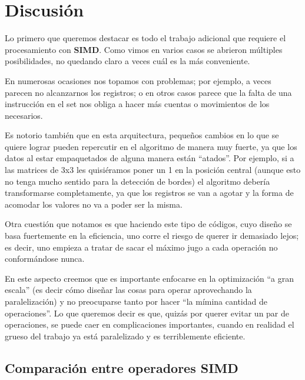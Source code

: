 \section{Discusión}

Lo primero que queremos destacar es todo el trabajo adicional que requiere el
procesamiento con \textbf{SIMD}. Como vimos en varios casos se abrieron múltiples
posibilidades, no quedando claro a veces cuál es la más conveniente.

En numerosas ocasiones nos topamos con problemas; por ejemplo, a veces parecen no
alcanzarnos los registros; o en otros casos parece que la falta de una instrucción
en el set nos obliga a hacer más cuentas o movimientos de los necesarios.

Es notorio también que en esta arquitectura, pequeños cambios en lo que se quiere
lograr pueden repercutir en el algoritmo de manera muy fuerte, ya que los datos al
estar empaquetados de alguna manera están ``atados''. Por ejemplo, si a las matrices
de 3x3 les quisiéramos poner un 1 en la posición central (aunque esto no tenga
mucho sentido para la detección de bordes) el algoritmo debería transformarse
completamente, ya que los registros se van a agotar y la forma de acomodar los 
valores no va a poder ser la misma.

Otra cuestión que notamos es que haciendo este tipo de códigos, cuyo diseño se basa
fuertemente en la eficiencia, uno corre el riesgo de querer ir demasiado lejos; es
decir, uno empieza a tratar de sacar el máximo jugo a cada operación no conformándose
nunca.

En este aspecto creemos que es importante enfocarse en la optimización ``a gran
escala'' (es decir cómo diseñar las cosas para operar aprovechando la paralelización)
y no preocuparse tanto por hacer ``la mímina cantidad de operaciones''. Lo que queremos
decir es que, quizás por querer evitar un par de operaciones, se puede caer en complicaciones
importantes, cuando en realidad el grueso del trabajo ya está paralelizado y es 
terriblemente eficiente.

\subsection{Comparación entre operadores SIMD}

